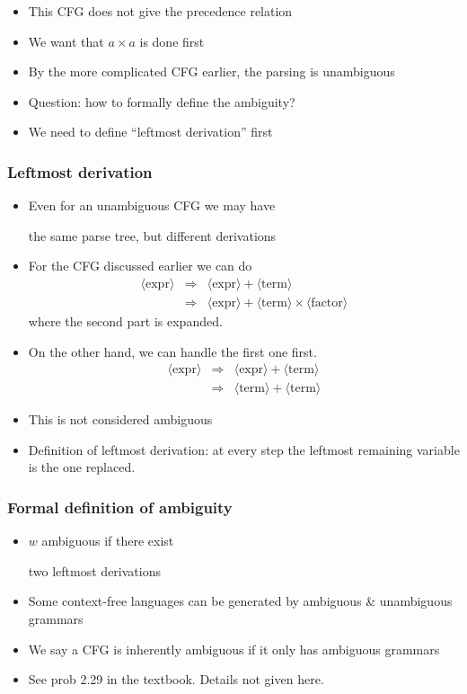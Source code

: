 \begin{frame}[allowframebreaks]
\begin{itemize}
\item This CFG does not give the precedence relation
\item We want that $a \times a$ is done first
\item By the more complicated CFG earlier,
  the parsing is unambiguous
\item Question: how to formally define the ambiguity?
\item We need to define ``leftmost derivation'' first
\end{itemize}\end{frame} \begin{frame}[allowframebreaks] \frametitle{Leftmost derivation}
  \begin{itemize}
  \item Even for an unambiguous CFG we may
    have
    \begin{center}
the same parse tree, but different derivations
\end{center}
\item For the CFG discussed earlier we can do
\begin{eqnarray*}
  \langle \text{expr}\rangle& \Rightarrow& \langle \text{expr}\rangle+\langle \text{term}\rangle\\
& \Rightarrow & \langle \text{expr}\rangle+\langle \text{term}\rangle\times\langle \text{factor}\rangle
\end{eqnarray*}
where the second part is expanded. 
\item On the other hand, we
can handle the first one first.
\begin{eqnarray*}
\langle \text{expr}\rangle & \Rightarrow & \langle \text{expr}\rangle + \langle \text{term}\rangle\\
& \Rightarrow & \langle \text{term}\rangle + \langle \text{term}\rangle
\end{eqnarray*}
\item This is not considered ambiguous
\item Definition of leftmost derivation:
  at every step the leftmost remaining variable is the one replaced.
\end{itemize}\end{frame} \begin{frame}[allowframebreaks] \frametitle{Formal definition of ambiguity}
  \begin{itemize}
\item $w$ ambiguous if there exist
  \begin{center}
two  leftmost derivations
\end{center}
\item Some context-free languages
can be generated by ambiguous \& unambiguous 
grammars
\item We say a CFG is inherently ambiguous
if it only has ambiguous grammars

\item See prob 2.29 in the textbook. Details not given here.

\end{itemize}\end{frame}



